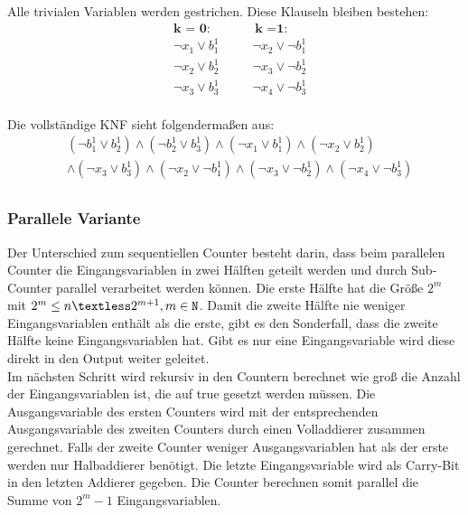 \documentclass[a4,abstract=on]{scrartcl}
\begin{document}
Alle trivialen Variablen werden gestrichen. Diese Klauseln bleiben bestehen:\\
\begin{align*}
&\textbf{k = 0:} {~~~~~~~~~~~~~~~~}\textbf{k =1:}\\
&\neg x_1 \vee b_1^1{~~~~~~~~~~~~}\neg x_2 \vee \neg b_1^1 \\
&\neg x_2 \vee b_2^1{~~~~~~~~~~~~}\neg x_3 \vee \neg b_2^1 \\
&\neg x_3 \vee b_3^1{~~~~~~~~~~~~}\neg x_4 \vee \neg b_3^1 \\
\end{align*}

Die vollständige KNF sieht folgendermaßen aus:\\
\begin{align*}
&(\neg b_1^1 \vee b_2^1) \wedge (\neg b_2^1 \vee b_3^1) \wedge (\neg x_1 \vee b_1^1) \wedge (\neg x_2 \vee b_2^1)\\ &\wedge (\neg x_3 \vee b_3^1) \wedge (\neg x_2 \vee \neg b_1^1) \wedge (\neg x_3 \vee \neg b_2^1) \wedge (\neg x_4 \vee \neg b_3^1) \\
\end{align*}

		\subsubsection{Parallele Variante}
Der Unterschied zum sequentiellen Counter besteht darin, dass beim parallelen Counter die Eingangsvariablen in zwei Hälften geteilt werden und durch Sub-Counter parallel verarbeitet werden können. Die erste Hälfte hat die Größe $2^m$ mit  $2^m \leq n \textless 2^{m+1}, m \in \mathtt{N}$. Damit die zweite Hälfte nie weniger Eingangsvariablen enthält als die erste, gibt es den Sonderfall, dass die zweite Hälfte keine Eingangsvariablen hat. Gibt es nur eine Eingangsvariable wird diese direkt in den Output weiter geleitet.\\
Im nächsten Schritt wird rekursiv in den Countern berechnet wie groß die Anzahl der Eingangsvariablen ist, die auf true gesetzt werden müssen. Die Ausgangsvariable des ersten Counters wird mit der entsprechenden Ausgangsvariable des zweiten Counters durch einen Volladdierer zusammen gerechnet. Falls der zweite Counter weniger Ausgangsvariablen hat als der erste werden nur Halbaddierer benötigt. Die letzte Eingangsvariable wird als Carry-Bit in den letzten Addierer gegeben. Die Counter berechnen somit parallel die Summe von $2^m-1$ Eingangsvariablen.\\
\end{document}
